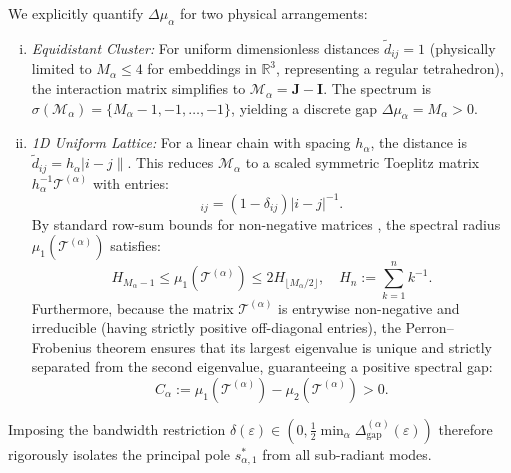 \documentclass[11pt,a4paper]{article}
\numberwithin{equation}{section}
\begin{document}
We explicitly quantify $\Delta\mu_\alpha$ for two physical arrangements:
\begin{enumerate}[(i)]
    \item \textit{Equidistant Cluster:} For uniform dimensionless distances $\widetilde{d}_{ij}=1$ (physically limited to $M_\alpha \le 4$ for embeddings in $\mathbb{R}^3$, representing a regular tetrahedron), the interaction matrix simplifies to $\mathcal{M}_\alpha = \mathbf{J} - \mathbf{I}$. The spectrum is $\sigma(\mathcal{M}_\alpha) = \{M_\alpha-1, -1, \dots, -1\}$, yielding a discrete gap $\Delta\mu_\alpha = M_\alpha > 0$.
     \item \textit{1D Uniform Lattice:} For a linear chain with spacing $h_\alpha$, the distance is $\widetilde{d}_{ij} = h_\alpha |i-j\|$. This reduces $\mathcal{M}_\alpha$ to a scaled symmetric Toeplitz matrix $h_\alpha^{-1}\mathcal{T}^{(\alpha)}$ with entries:
    \begin{equation}
        [\mathcal{T}^{(\alpha)}]_{ij} = (1 - \delta_{ij})|i-j|^{-1}.
    \end{equation}
    By standard row-sum bounds for non-negative matrices \cite{la1}, the spectral radius $\mu_1(\mathcal{T}^{(\alpha)})$ satisfies:
    \begin{equation}
        H_{M_\alpha-1} \le \mu_1(\mathcal{T}^{(\alpha)}) \le 2 H_{\lfloor M_\alpha/2 \rfloor}, \quad H_n := \sum_{k=1}^n k^{-1}.
    \end{equation}
    Furthermore, because the matrix $\mathcal{T}^{(\alpha)}$ is entrywise non-negative and irreducible (having strictly positive off-diagonal entries), the Perron--Frobenius theorem \cite[Ch. 8]{la1} ensures that its largest eigenvalue is unique and strictly separated from the second eigenvalue, guaranteeing a positive spectral gap:
    \begin{equation}
        C_{\alpha} := \mu_1(\mathcal{T}^{(\alpha)}) - \mu_2(\mathcal{T}^{(\alpha)}) > 0.
    \end{equation}
\end{enumerate}
Imposing the bandwidth restriction $\delta(\varepsilon) \in \left(0, \frac{1}{2} \min_\alpha \Delta_{\text{gap}}^{(\alpha)}(\varepsilon)\right)$ therefore rigorously isolates the principal pole $s_{\alpha, 1}^\ast$ from all sub-radiant modes.
\end{document}
